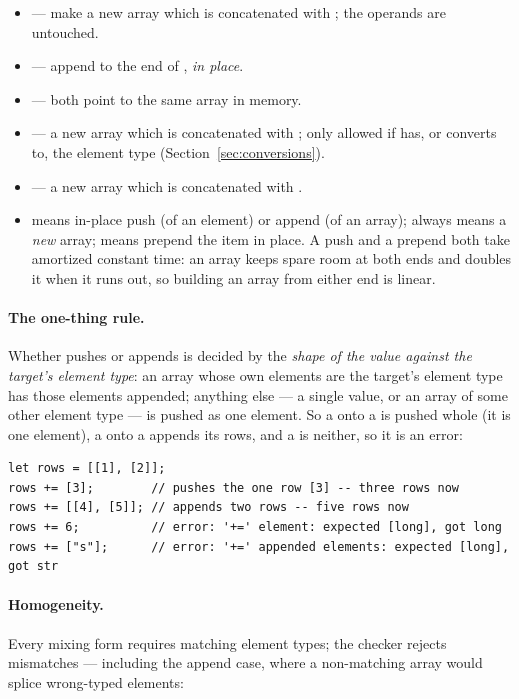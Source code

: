 \begin{itemize}[nosep]
\item {} --- make a new array which is 
  concatenated with ; the operands are untouched.
\item {} --- append  to the end of ,
  \emph{in place}.
\item {} --- both point to the same array in memory.
\item {} --- a new array which is  concatenated
  with \ic{[elem]}; only allowed if  has, or converts to, the
  element type (Section~\ref{sec:conversions}).
\item {} --- a new array which is \ic{[elem]} concatenated
  with .
\item \ic{+=} means in-place push (of an element) or append (of an
  array); \ic{+} always means a \emph{new} array; \ic{*=} means prepend
  the item in place. A push and a prepend both take amortized constant
  time: an array keeps spare room at both ends and doubles it when it
  runs out, so building an array from either end is linear.
\end{itemize}

\paragraph{The one-thing rule.} Whether \ic{+=} pushes or appends is
decided by the \emph{shape of the value against the target's element
type}: an array whose own elements are the target's element type has
those elements appended; anything else --- a single value, or an array of
some other element type --- is pushed as one element. So a \ic{[long]}
onto a \ic{[[long]]} is pushed whole (it is one \ic{[long]} element), a
\ic{[[long]]} onto a \ic{[[long]]} appends its rows, and a \ic{[str]} is
neither, so it is an error:

\begin{lstlisting}
let rows = [[1], [2]];
rows += [3];        // pushes the one row [3] -- three rows now
rows += [[4], [5]]; // appends two rows -- five rows now
rows += 6;          // error: '+=' element: expected [long], got long
rows += ["s"];      // error: '+=' appended elements: expected [long], got str
\end{lstlisting}

\paragraph{Homogeneity.} Every mixing form requires matching element
types; the checker rejects mismatches --- including the append case, where
a non-matching array would splice wrong-typed elements:

